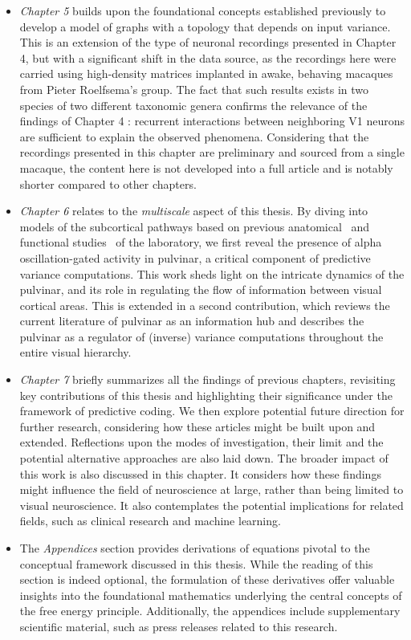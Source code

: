 \begin{itemize}
\item \textit{Chapter 5} builds upon the foundational concepts established previously to develop a model of graphs with a topology that depends on input variance. This is an extension of the type of neuronal recordings presented in Chapter 4, but with a significant shift in the data source, as the recordings here were carried using high-density matrices implanted in awake, behaving macaques from Pieter Roelfsema's group.
The fact that such results exists in two species of two different taxonomic genera confirms the relevance of the findings of Chapter 4 : recurrent interactions between neighboring V1 neurons are sufficient to explain the observed phenomena. Considering that the recordings presented in this chapter are preliminary and sourced from a single macaque, the content here is not developed into a full article and is notably shorter compared to other chapters.

\item \textit{Chapter 6} relates to the \textit{multiscale} aspect of this thesis. By diving into models of the subcortical pathways based on previous anatomical~\cite{abbas2020hierarchical} and functional studies~\cite{de2020pulvinar} of the laboratory, we first reveal the presence of alpha oscillation-gated activity in pulvinar, a critical component of predictive variance computations. This work sheds light on the intricate dynamics of the pulvinar, and its role in regulating the flow of information between visual cortical areas.
This is extended in a second contribution, which reviews the current literature of pulvinar as an information hub and describes the pulvinar as a regulator of (inverse) variance computations throughout the entire visual hierarchy. 

\item \textit{Chapter 7} briefly summarizes all the findings of previous chapters, revisiting key contributions of this thesis and highlighting their significance under the framework of predictive coding. We then explore potential future direction for further research, considering how these articles might be built upon and extended. Reflections upon the modes of investigation, their limit and the potential alternative approaches are also laid down. 
The broader impact of this work is also discussed in this chapter. It considers how these findings might influence the field of neuroscience at large, rather than being limited to visual neuroscience. It also contemplates the potential implications for related fields, such as clinical research and machine learning.

\item The \textit{Appendices} section provides derivations of equations pivotal to the conceptual framework discussed in this thesis. While the reading of this section is indeed optional, the formulation of these derivatives offer valuable insights into the foundational mathematics underlying the central concepts of the free energy principle. Additionally, the appendices include supplementary scientific material, such as press releases related to this research. 
\end{itemize}